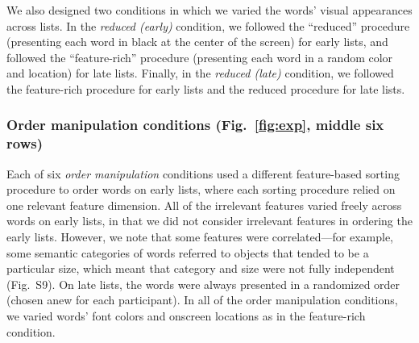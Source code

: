 \documentclass[11pt]{article}
\newcommand{\featureCorrs}{S9}
\begin{document}
We also designed two conditions in which we varied the words' visual appearances
across lists. In the \textit{reduced (early)} condition, we followed the
``reduced'' procedure (presenting each word in black at the center of the
screen) for early lists, and followed the ``feature-rich'' procedure
(presenting each word in a random color and location) for late lists. Finally,
in the \textit{reduced (late)} condition, we followed the feature-rich
procedure for early lists and the reduced procedure for late lists.

\subsubsection*{Order manipulation conditions (Fig.~\ref{fig:exp}, middle six
rows)}

Each of six \textit{order manipulation} conditions used a different
feature-based sorting procedure to order words on early lists, where each
sorting procedure relied on one relevant feature dimension. All of the
irrelevant features varied freely across words on early lists, in that we did
not consider irrelevant features in ordering the early lists. However, we note
that some features were correlated---for example, some semantic categories of
words referred to objects that tended to be a particular size, which meant that
category and size were not fully independent (Fig.~\featureCorrs). On late
lists, the words were always presented in a randomized order (chosen anew for
each participant). In all of the order manipulation conditions, we varied
words' font colors and onscreen locations as in the feature-rich condition.
\end{document}
